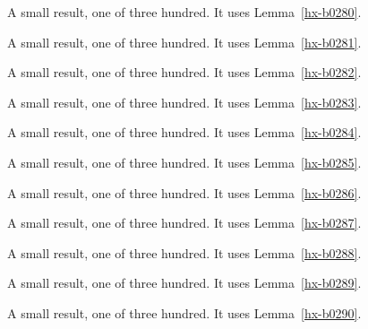 \begin{lemma}[Bulk 281]\label{hx-b0281}
A small result, one of three hundred. It uses Lemma~\ref{hx-b0280}.
\end{lemma}

\begin{lemma}[Bulk 282]\label{hx-b0282}
A small result, one of three hundred. It uses Lemma~\ref{hx-b0281}.
\end{lemma}

\begin{lemma}[Bulk 283]\label{hx-b0283}
A small result, one of three hundred. It uses Lemma~\ref{hx-b0282}.
\end{lemma}

\begin{lemma}[Bulk 284]\label{hx-b0284}
A small result, one of three hundred. It uses Lemma~\ref{hx-b0283}.
\end{lemma}

\begin{lemma}[Bulk 285]\label{hx-b0285}
A small result, one of three hundred. It uses Lemma~\ref{hx-b0284}.
\end{lemma}

\begin{lemma}[Bulk 286]\label{hx-b0286}
A small result, one of three hundred. It uses Lemma~\ref{hx-b0285}.
\end{lemma}

\begin{lemma}[Bulk 287]\label{hx-b0287}
A small result, one of three hundred. It uses Lemma~\ref{hx-b0286}.
\end{lemma}

\begin{lemma}[Bulk 288]\label{hx-b0288}
A small result, one of three hundred. It uses Lemma~\ref{hx-b0287}.
\end{lemma}

\begin{lemma}[Bulk 289]\label{hx-b0289}
A small result, one of three hundred. It uses Lemma~\ref{hx-b0288}.
\end{lemma}

\begin{lemma}[Bulk 290]\label{hx-b0290}
A small result, one of three hundred. It uses Lemma~\ref{hx-b0289}.
\end{lemma}

\begin{lemma}[Bulk 291]\label{hx-b0291}
A small result, one of three hundred. It uses Lemma~\ref{hx-b0290}.
\end{lemma}

